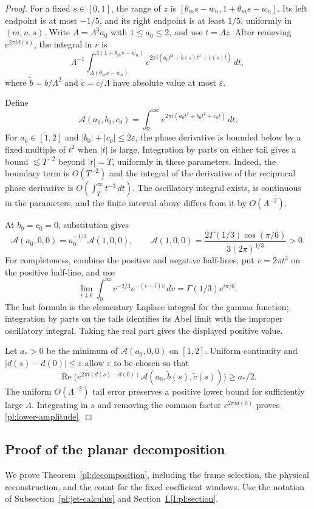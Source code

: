 \documentclass[11pt]{amsart}
\theoremstyle{definition}
\theoremstyle{remark}
\newcommand{\R}{\mathbb R}
\numberwithin{equation}{section}
\newcommand{\partIref}[1]{\hyperref[I:#1]{I.\ref*{I:#1}}}
\begin{document}
\begin{proof}
For a fixed $s\in[0,1]$, the range of $z$ is $[\theta_ms-w_n,1+\theta_ms-w_n]$. Its left endpoint is at most $-1/5$, and its right endpoint is at least $1/5$, uniformly in $(m,n,s)$. Write $A=\Lambda^3a_0$ with $1\le a_0\le2$, and use $t=\Lambda z$. After removing $e^{2\pi i d(s)}$, the integral in $r$ is
\[
\Lambda^{-1}\int_{\Lambda(\theta_ms-w_n)}^{\Lambda(1+\theta_ms-w_n)}
e^{2\pi i(a_0t^3+\widetilde b(s)t^2+\widetilde c(s)t)}\,dt,
\]
where $\widetilde b=b/\Lambda^2$ and $\widetilde c=c/\Lambda$ have absolute value at most $\varepsilon$.

Define
\[
\mathcal A(a_0,b_0,c_0)=\int_{\R}^{\mathrm{osc}}e^{2\pi i(a_0t^3+b_0t^2+c_0t)}\,dt.
\]
For $a_0\in[1,2]$ and $|b_0|+|c_0|\le2\varepsilon$, the phase derivative is bounded below by a fixed multiple of $t^2$ when $|t|$ is large. Integration by parts on either tail gives a bound $\lesssim T^{-2}$ beyond $|t|=T$, uniformly in these parameters. Indeed, the boundary term is $O(T^{-2})$ and the integral of the derivative of the reciprocal phase derivative is $O(\int_T^\infty t^{-3}\,dt)$. The oscillatory integral exists, is continuous in the parameters, and the finite interval above differs from it by $O(\Lambda^{-2})$.

At $b_0=c_0=0$, substitution gives
\[
\mathcal A(a_0,0,0)=a_0^{-1/3}\mathcal A(1,0,0),
\qquad
\mathcal A(1,0,0)=\frac{2\Gamma(1/3)\cos(\pi/6)}{3(2\pi)^{1/3}}>0.
\]
For completeness, combine the positive and negative half-lines, put $v=2\pi t^3$ on the positive half-line, and use
\[
\lim_{\epsilon\downarrow0}\int_0^\infty v^{-2/3}e^{-(\epsilon-i)v}\,dv
=\Gamma(1/3)e^{i\pi/6}.
\]
The last formula is the elementary Laplace integral for the gamma function; integration by parts on the tails identifies its Abel limit with the improper oscillatory integral. Taking the real part gives the displayed positive value.

Let $a_*>0$ be the minimum of $\mathcal A(a_0,0,0)$ on $[1,2]$. Uniform continuity and $|d(s)-d(0)|\le\varepsilon$ allow $\varepsilon$ to be chosen so that
\[
\operatorname{Re}\bigl(e^{2\pi i(d(s)-d(0))}
\mathcal A(a_0,\widetilde b(s),\widetilde c(s))\bigr)\ge a_*/2.
\]
The uniform $O(\Lambda^{-2})$ tail error preserves a positive lower bound for sufficiently large $\Lambda$. Integrating in $s$ and removing the common factor $e^{2\pi i d(0)}$ proves \eqref{pl:lower-amplitude}.
\end{proof}

\subsection{Proof of the planar decomposition}\label{sup:planar-proof}
We prove Theorem~\ref{pl:decomposition}, including the frame selection, the physical reconstruction, and the count for the fixed coefficient windows. Use the notation of Subsection~\ref{pl:jet-calculus} and Section~\partIref{pl:section}.
\end{document}
